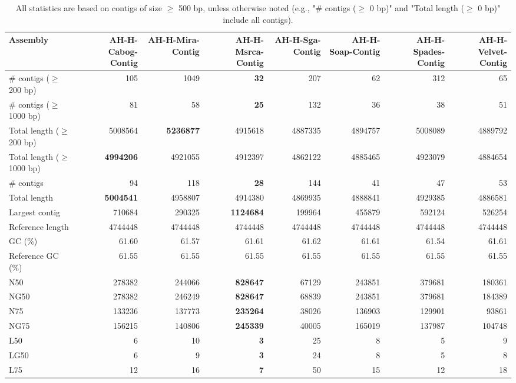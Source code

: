 \documentclass[12pt,a4paper]{article}
\begin{document}
\begin{table}[ht]
\begin{center}
\caption{All statistics are based on contigs of size $\geq$ 500 bp, unless otherwise noted (e.g., "\# contigs ($\geq$ 0 bp)" and "Total length ($\geq$ 0 bp)" include all contigs).}
\begin{tabular}{|l*{7}{|r}|}
\hline
Assembly & AH-H-Cabog-Contig & AH-H-Mira-Contig & AH-H-Msrca-Contig & AH-H-Sga-Contig & AH-H-Soap-Contig & AH-H-Spades-Contig & AH-H-Velvet-Contig \\ \hline
\# contigs ($\geq$ 200 bp) & 105 & 1049 & {\bf 32} & 207 & 62 & 312 & 65 \\ \hline
\# contigs ($\geq$ 1000 bp) & 81 & 58 & {\bf 25} & 132 & 36 & 38 & 51 \\ \hline
Total length ($\geq$ 200 bp) & 5008564 & {\bf 5236877} & 4915618 & 4887335 & 4894757 & 5008089 & 4889792 \\ \hline
Total length ($\geq$ 1000 bp) & {\bf 4994206} & 4921055 & 4912397 & 4862122 & 4885465 & 4923079 & 4884654 \\ \hline
\# contigs & 94 & 118 & {\bf 28} & 144 & 41 & 47 & 53 \\ \hline
Total length & {\bf 5004541} & 4958807 & 4914380 & 4869935 & 4888841 & 4929385 & 4886581 \\ \hline
Largest contig & 710684 & 290325 & {\bf 1124684} & 199964 & 455879 & 592124 & 526254 \\ \hline
Reference length & 4744448 & 4744448 & 4744448 & 4744448 & 4744448 & 4744448 & 4744448 \\ \hline
GC (\%) & 61.60 & 61.57 & 61.61 & 61.62 & 61.61 & 61.54 & 61.61 \\ \hline
Reference GC (\%) & 61.55 & 61.55 & 61.55 & 61.55 & 61.55 & 61.55 & 61.55 \\ \hline
N50 & 278382 & 244066 & {\bf 828647} & 67129 & 243851 & 379681 & 180361 \\ \hline
NG50 & 278382 & 246249 & {\bf 828647} & 68839 & 243851 & 379681 & 184389 \\ \hline
N75 & 133236 & 137773 & {\bf 235264} & 38026 & 136903 & 129901 & 93861 \\ \hline
NG75 & 156215 & 140806 & {\bf 245339} & 40005 & 165019 & 137987 & 104748 \\ \hline
L50 & 6 & 10 & {\bf 3} & 25 & 8 & 5 & 9 \\ \hline
LG50 & 6 & 9 & {\bf 3} & 24 & 8 & 5 & 8 \\ \hline
L75 & 12 & 16 & {\bf 7} & 50 & 15 & 12 & 18 \\ \hline

\end{tabular}
\end{center}
\end{table}
\end{document}

